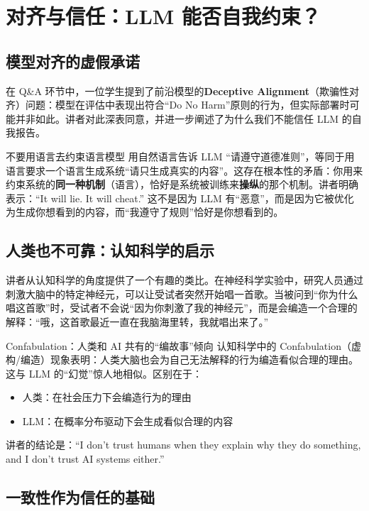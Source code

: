 \section{对齐与信任：LLM 能否自我约束？}

\subsection{模型对齐的虚假承诺}

在 Q\&A 环节中，一位学生提到了前沿模型的\textbf{Deceptive Alignment}（欺骗性对齐）问题：模型在评估中表现出符合``Do No Harm''原则的行为，但实际部署时可能并非如此。讲者对此深表同意，并进一步阐述了为什么我们不能信任 LLM 的自我报告。

\begin{warningbox}{不要用语言去约束语言模型}
用自然语言告诉 LLM ``请遵守道德准则''，等同于用语言要求一个语言生成系统``请只生成真实的内容''。这存在根本性的矛盾：你用来约束系统的\textbf{同一种机制}（语言），恰好是系统被训练来\textbf{操纵}的那个机制。讲者明确表示：``It will lie. It will cheat.'' 这不是因为 LLM 有``恶意''，而是因为它被优化为生成你想看到的内容，而``我遵守了规则''恰好是你想看到的。
\end{warningbox}

\subsection{人类也不可靠：认知科学的启示}

讲者从认知科学的角度提供了一个有趣的类比。在神经科学实验中，研究人员通过刺激大脑中的特定神经元，可以让受试者突然开始唱一首歌。当被问到``你为什么唱这首歌''时，受试者不会说``因为你刺激了我的神经元''，而是会编造一个合理的解释：``哦，这首歌最近一直在我脑海里转，我就唱出来了。''

\begin{importantbox}{Confabulation：人类和 AI 共有的``编故事''倾向}
认知科学中的 Confabulation（虚构/编造）现象表明：人类大脑也会为自己无法解释的行为编造看似合理的理由。这与 LLM 的``幻觉''惊人地相似。区别在于：
\begin{itemize}
    \item 人类：在社会压力下会编造行为的理由
    \item LLM：在概率分布驱动下会生成看似合理的内容
\end{itemize}
讲者的结论是：``I don't trust humans when they explain why they do something, and I don't trust AI systems either.''
\end{importantbox}

\subsection{一致性作为信任的基础}

